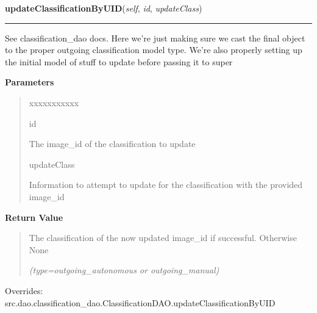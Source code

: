 \hspace{.8\funcindent}\begin{boxedminipage}{\funcwidth}

    \raggedright \textbf{updateClassificationByUID}(\textit{self}, \textit{id}, \textit{updateClass})

    \vspace{-1.5ex}

    \rule{\textwidth}{0.5\fboxrule}
\setlength{\parskip}{2ex}
    See classification\_dao docs. Here we're just making sure we cast the 
    final object to the proper outgoing classification model type. We're 
    also properly setting up the initial model of stuff to update before 
    passing it to super

\setlength{\parskip}{1ex}
      \textbf{Parameters}
      \vspace{-1ex}

      \begin{quote}
        \begin{Ventry}{xxxxxxxxxxx}

          \item[id]

          The image\_id of the classification to update

          \item[updateClass]

          Information to attempt to update for the classification with the 
          provided image\_id

        \end{Ventry}

      \end{quote}

      \textbf{Return Value}
    \vspace{-1ex}

      \begin{quote}
      The classification of the now updated image\_id if successful. 
      Otherwise None

      {\it (type=outgoing\_autonomous or outgoing\_manual)}

      \end{quote}

      Overrides: src.dao.classification\_dao.ClassificationDAO.updateClassificationByUID

    \end{boxedminipage}

    \vspace{0.5ex}

